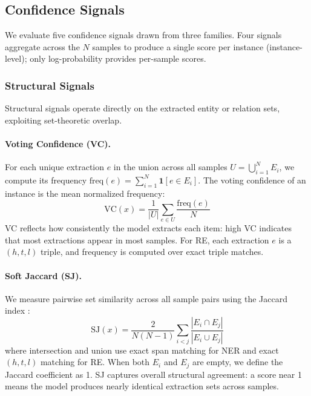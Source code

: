 \subsection{Confidence Signals}\label{sec:signals}

We evaluate five confidence signals drawn from three families.
Four signals aggregate across the $N$ samples to produce a single score per instance (instance-level); only log-probability provides per-sample scores.

\subsubsection{Structural Signals}

Structural signals operate directly on the extracted entity or relation sets, exploiting set-theoretic overlap.

\paragraph{Voting Confidence (VC).}
For each unique extraction $e$ in the union across all samples $U = \bigcup_{i=1}^{N} E_i$, we compute its frequency $\mathrm{freq}(e) = \sum_{i=1}^{N} \mathbf{1}[e \in E_i]$.
The voting confidence of an instance is the mean normalized frequency:
\begin{equation}
    \mathrm{VC}(x) = \frac{1}{|U|} \sum_{e \in U} \frac{\mathrm{freq}(e)}{N}
    \label{eq:vc}
\end{equation}
VC reflects how consistently the model extracts each item: high VC indicates that most extractions appear in most samples.
For RE, each extraction $e$ is a $(h, t, l)$ triple, and frequency is computed over exact triple matches.

\paragraph{Soft Jaccard (SJ).}
We measure pairwise set similarity across all sample pairs using the Jaccard index \cite{jaccard1901distribution}:
\begin{equation}
    \mathrm{SJ}(x) = \frac{2}{N(N-1)} \sum_{i < j} \frac{|E_i \cap E_j|}{|E_i \cup E_j|}
    \label{eq:sj}
\end{equation}
where intersection and union use exact span matching for NER and exact $(h, t, l)$ matching for RE.
When both $E_i$ and $E_j$ are empty, we define the Jaccard coefficient as 1.
SJ captures overall structural agreement: a score near 1 means the model produces nearly identical extraction sets across samples.

